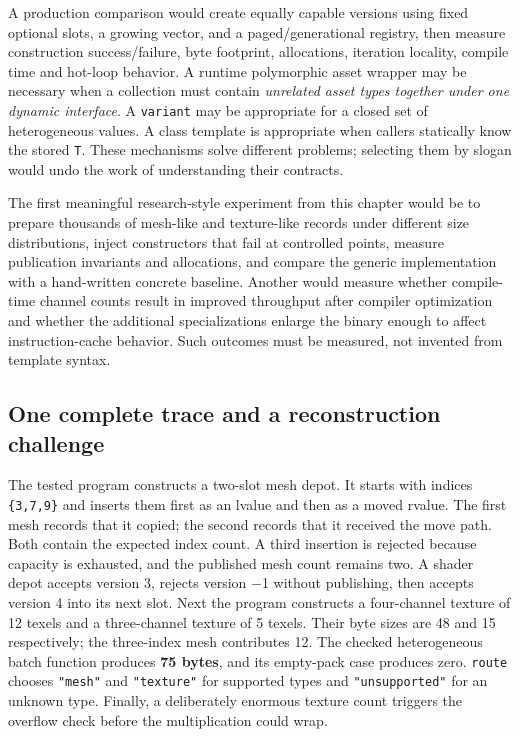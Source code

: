 A production comparison would create equally capable versions using fixed optional slots, a growing vector, and a paged/generational registry, then measure construction success/failure, byte footprint, allocations, iteration locality, compile time and hot-loop behavior. A runtime polymorphic asset wrapper may be necessary when a collection must contain \emph{unrelated asset types together under one dynamic interface}. A \texttt{variant} may be appropriate for a closed set of heterogeneous values. A class template is appropriate when callers statically know the stored \texttt{T}. These mechanisms solve different problems; selecting them by slogan would undo the work of understanding their contracts.

The first meaningful research-style experiment from this chapter would be to prepare thousands of mesh-like and texture-like records under different size distributions, inject constructors that fail at controlled points, measure publication invariants and allocations, and compare the generic implementation with a hand-written concrete baseline. Another would measure whether compile-time channel counts result in improved throughput after compiler optimization and whether the additional specializations enlarge the binary enough to affect instruction-cache behavior. Such outcomes must be measured, not invented from template syntax.

\subsection{One complete trace and a reconstruction challenge}\label{01-foundations-i-ch005-one-complete-trace-and-a-reconstruction-challenge}

The tested program constructs a two-slot mesh depot. It starts with indices \texttt{\{3,7,9\}} and inserts them first as an lvalue and then as a moved rvalue. The first mesh records that it copied; the second records that it received the move path. Both contain the expected index count. A third insertion is rejected because capacity is exhausted, and the published mesh count remains two. A shader depot accepts version 3, rejects version −1 without publishing, then accepts version 4 into its next slot. Next the program constructs a four-channel texture of 12 texels and a three-channel texture of 5 texels. Their byte sizes are 48 and 15 respectively; the three-index mesh contributes 12. The checked heterogeneous batch function produces \textbf{75 bytes}, and its empty-pack case produces zero. \texttt{route} chooses \texttt{"mesh"} and \texttt{"texture"} for supported types and \texttt{"unsupported"} for an unknown type. Finally, a deliberately enormous texture count triggers the overflow check before the multiplication could wrap.

